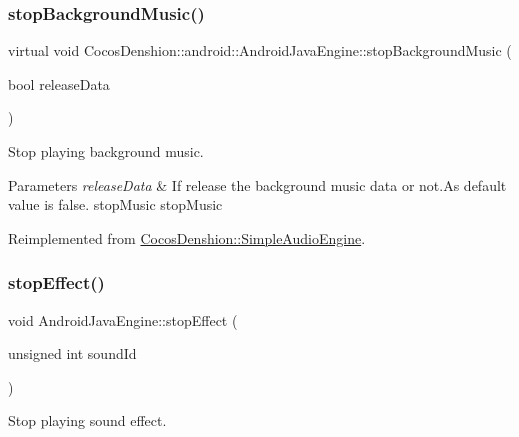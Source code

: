 \subsubsection{\texorpdfstring{stop\+Background\+Music()}{stopBackgroundMusic()}\hspace{0.1cm}{\footnotesize\ttfamily [2/2]}}
{\footnotesize\ttfamily virtual void Cocos\+Denshion\+::android\+::\+Android\+Java\+Engine\+::stop\+Background\+Music (\begin{DoxyParamCaption}\item[{bool}]{release\+Data }\end{DoxyParamCaption})\hspace{0.3cm}{\ttfamily [virtual]}}

Stop playing background music.


\begin{DoxyParams}{Parameters}
{\em release\+Data} & If release the background music data or not.\+As default value is false.  stop\+Music  stop\+Music \\
\hline
\end{DoxyParams}


Reimplemented from \hyperlink{classCocosDenshion_1_1SimpleAudioEngine_a3c67d3e233924b25d67bc198aaa4553c}{Cocos\+Denshion\+::\+Simple\+Audio\+Engine}.

\mbox{\label{classCocosDenshion_1_1android_1_1AndroidJavaEngine_ad400c573b14ae0a45e3977808acae5fb}} 
\subsubsection{\texorpdfstring{stop\+Effect()}{stopEffect()}\hspace{0.1cm}{\footnotesize\ttfamily [1/2]}}
{\footnotesize\ttfamily void Android\+Java\+Engine\+::stop\+Effect (\begin{DoxyParamCaption}\item[{unsigned int}]{sound\+Id }\end{DoxyParamCaption})\hspace{0.3cm}{\ttfamily [virtual]}}

Stop playing sound effect.


